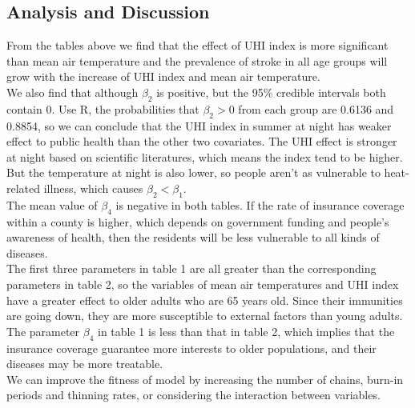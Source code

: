 \documentclass{article}
\begin{document}
\subsection{Analysis and Discussion}
From the tables above we find that the effect of UHI index is more significant than mean air temperature and the prevalence of stroke in all age groups will grow with the increase of UHI index and mean air temperature. 
\\
\indent
We also find that although $\beta_2$ is positive, but the 95\% credible intervals both contain 0. Use R, the probabilities that $\beta_2>0$ from each group are 0.6136 and 0.8854, so we can conclude that the UHI index in summer at night has weaker effect to public health than the other two covariates. The UHI effect is stronger at night based on scientific literatures, which means the index tend to be higher. But the temperature at night is also lower, so people aren't as vulnerable to heat-related illness, which causes $\beta_2<\beta_1$.
\\
\indent
The mean value of $\beta_4$ is negative in both tables. If the rate of insurance coverage within a county is higher, which depends on government funding and people's awareness of health, then the residents will be less vulnerable to all kinds of diseases. 
\\
\indent
The first three parameters in table 1 are all greater than the corresponding parameters in table 2, so the variables of mean air temperatures and UHI index have a greater effect to older adults who are 65 years old. Since their immunities are going down, they are more susceptible to external factors than young adults. The parameter $\beta_4$ in table 1 is less than that in table 2, which implies that the insurance coverage guarantee more interests to older populations, and their diseases may be more treatable.
\\
\indent
We can improve the fitness of model by increasing the number of chains, burn-in periods and thinning rates, or considering the interaction between variables.
\end{document}
